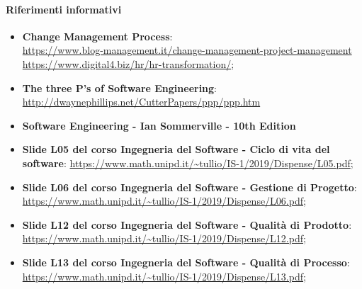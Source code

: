 \paragraph{Riferimenti informativi}
\begin{itemize}
	\item \textbf{Change Management Process}: \\
	\href{https://www.blog-management.it/2018/04/10/change-management-project-management/}{https://www.blog-management.it/change-management-project-management}\\
	\href{https://www.digital4.biz/hr/hr-transformation/digital-transformation-e-change-management-vanno-avanti-di-pari-passo/}{https://www.digital4.biz/hr/hr-transformation/};
	\item \textbf{The three P's of Software Engineering}: \\
	\url{http://dwaynephillips.net/CutterPapers/ppp/ppp.htm}
	\item \textbf{Software Engineering - Ian Sommerville - 10th Edition}
	\item \textbf{Slide L05 del corso Ingegneria del Software - Ciclo di vita del software}: 
	\url{https://www.math.unipd.it/~tullio/IS-1/2019/Dispense/L05.pdf};
	\item \textbf{Slide L06 del corso Ingegneria del Software - Gestione di Progetto}: 
	\url{https://www.math.unipd.it/~tullio/IS-1/2019/Dispense/L06.pdf};	
	\item \textbf{Slide L12 del corso Ingegneria del Software - Qualità di Prodotto}: 
	\url{https://www.math.unipd.it/~tullio/IS-1/2019/Dispense/L12.pdf};
	\item \textbf{Slide L13 del corso Ingegneria del Software - Qualità di Processo}: 
	\url{https://www.math.unipd.it/~tullio/IS-1/2019/Dispense/L13.pdf};
\end{itemize}